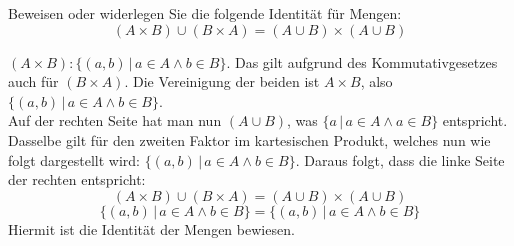 \documentclass[a4paper, margins=2.5cm]{homework}
\begin{document}
\begin{problem}
	Beweisen oder widerlegen Sie die folgende Identität für Mengen:
	\[ (A\times B) \cup (B\times A) = (A\cup B) \times (A\cup B) \]
\end{problem}
\begin{solution}
	$(A\times B): \{ (a,b)\, |\, a \in A \wedge b \in B\}$. Das gilt aufgrund des
	Kommutativgesetzes auch für $(B\times A)$. Die Vereinigung der beiden ist
	$A\times B$, also $\{ (a,b)\, |\, a \in A \wedge b \in B \}$. \\

	Auf der rechten Seite hat man nun $(A\cup B)$, was $\{ a\, |\, a\in A\wedge a\in B \}$
	entspricht. Dasselbe gilt für den zweiten Faktor im kartesischen Produkt, welches
	nun wie folgt dargestellt wird: $\{ (a,b)\, |\, a \in A \wedge b \in B \}$.
	Daraus folgt, dass die linke Seite der rechten entspricht:
	\[ (A\times B) \cup (B\times A) = (A\cup B) \times (A\cup B) \]
	\[ \{ (a,b)\, |\, a \in A \wedge b \in B \} = \{ (a,b)\, |\, a \in A \wedge b \in B \} \]
	Hiermit ist die Identität der Mengen bewiesen.
\end{solution}
\end{document}
